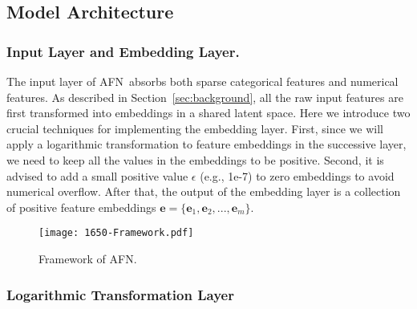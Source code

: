 \documentclass[letterpaper]{article} \usepackage{aaai20}  \usepackage{times}  \usepackage{helvet} \usepackage{courier}  \usepackage[hyphens]{url}  \usepackage{graphicx} \urlstyle{rm} \def\UrlFont{\rm}  \usepackage{graphicx}  \frenchspacing  \setlength{\pdfpagewidth}{8.5in}  \setlength{\pdfpageheight}{11in}
\newcommand{\model}{{AFN}~}
\newcommand{\modelns}{{AFN}}
\begin{document}
\subsection{Model Architecture}
    
\subsubsection{Input Layer and Embedding Layer.}

The input layer of \model absorbs both sparse categorical features and numerical features. 
As described in Section~\ref{sec:background}, all the raw input features are first transformed into embeddings in a shared latent space. Here we introduce two crucial techniques for implementing the embedding layer. 
First, since we will apply a logarithmic transformation to feature embeddings in the successive layer, we need to keep all the values in the embeddings to be positive. Second, it is advised to add a small positive value $\epsilon$ (e.g., 1e-7) to zero embeddings to avoid numerical overflow.
After that, the output of the embedding layer is a collection of positive feature embeddings $\mathbf{e}=\{\mathbf{e}_1,\mathbf{e}_2,...,\mathbf{e}_m\}$.
 
 \begin{figure}[t]
\centering 
 	\texttt{[image: 1650-Framework.pdf]}
 	\caption{Framework of \modelns.}
 	\label{fig:framework}
 \end{figure}
 
\subsubsection{Logarithmic Transformation Layer}
\end{document}
